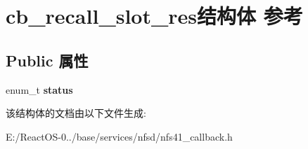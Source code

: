 \hypertarget{structcb__recall__slot__res}{}\section{cb\+\_\+recall\+\_\+slot\+\_\+res结构体 参考}
\label{structcb__recall__slot__res}
\subsection*{Public 属性}
\begin{DoxyCompactItemize}
\item 
\mbox{\label{structcb__recall__slot__res_a723d501cdc5eba2055c34cb37b976244}} 
enum\+\_\+t {\bfseries status}
\end{DoxyCompactItemize}


该结构体的文档由以下文件生成\+:\begin{DoxyCompactItemize}
\item 
E\+:/\+React\+O\+S-\/0../base/services/nfsd/nfs41\+\_\+callback.\+h\end{DoxyCompactItemize}
